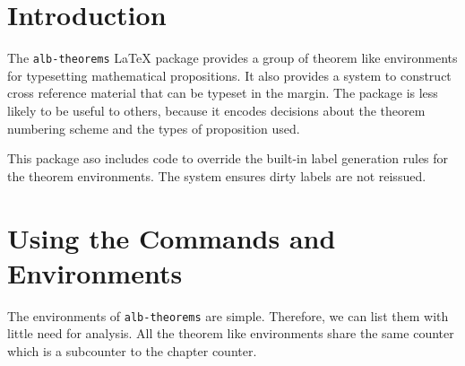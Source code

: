 \documentclass[11pt,a4paper,oneside,titlepage]{alb-latex}
\begin{document}

\section{Introduction}
\label{sec:alb-theorems-documentation:intr}

The \texttt{alb-theorems} \LaTeX{} package provides a group of theorem
like environments for typesetting mathematical propositions.  It also
provides a system to construct cross reference material that can be
typeset in the margin.  The package is less likely to be useful to
others, because it encodes decisions about the theorem numbering scheme
and the types of proposition used.

This package aso includes \AUCTeX{} code to override the built-in label
generation rules for the theorem environments.  The system ensures dirty
labels are not reissued.




\section{Using the Commands and Environments}
\label{sec:alb-theorems-documentation:using-comm-envir}

The environments of \texttt{alb-theorems} are simple.  Therefore, we can
list them with little need for analysis.  All the theorem like
environments share the same counter which is a subcounter to the chapter
counter.
\end{document}

